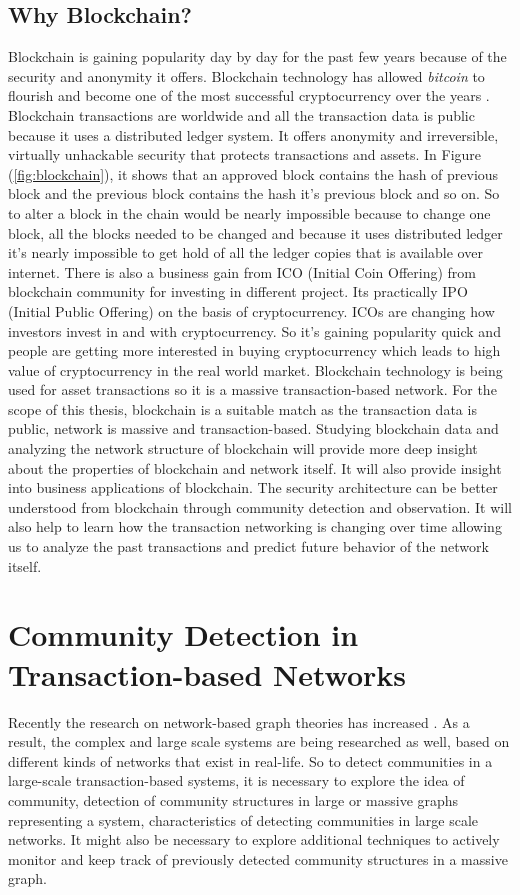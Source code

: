 \subsection{Why Blockchain?}
Blockchain is gaining popularity day by day for the past few years because of the security and anonymity it offers. Blockchain technology has allowed \textit{bitcoin} to flourish and become one of the most successful cryptocurrency over the years \cite{ref-41}. Blockchain transactions are worldwide and all the transaction data is public because it uses a distributed ledger system. It offers anonymity and irreversible, virtually unhackable security that protects transactions and assets. In Figure (\ref{fig:blockchain}), it shows that an approved block contains the hash of previous block and the previous block contains the hash it's previous block and so on. So to alter a block in the chain would be nearly impossible because to change one block, all the blocks needed to be changed and because it uses distributed ledger it's nearly impossible to get hold of all the ledger copies that is available over internet. There is also a business gain from ICO (Initial Coin Offering) from blockchain community for investing in different project. Its practically IPO (Initial Public Offering) on the basis of cryptocurrency. ICOs are changing how investors invest in and with cryptocurrency. So it's gaining popularity quick and people are getting more interested in buying cryptocurrency which leads to high value of cryptocurrency in the real world market. Blockchain technology is being used for asset transactions so it is a massive transaction-based network. For the scope of this thesis, blockchain is a suitable match as the transaction data is public, network is massive and transaction-based. Studying blockchain data and analyzing the network structure of blockchain will provide more deep insight about the properties of blockchain and network itself. It will also provide insight into business applications of blockchain. The security architecture can be better understood from blockchain through community detection and observation. It will also help to learn how the transaction networking is changing over time allowing us to analyze the past transactions and predict future behavior of the network itself.

\section{Community Detection in Transaction-based Networks}
Recently the research on network-based graph theories has increased \cite{ref-1}. As a result, the complex and large scale systems are being researched as well, based on different kinds of networks that exist in real-life. So to detect communities in a large-scale transaction-based systems, it is necessary to explore the idea of community, detection of community structures in large or massive graphs representing a system, characteristics of detecting communities in large scale networks. It might also be necessary to explore additional techniques to actively monitor and keep track of previously detected community structures in a massive graph.

